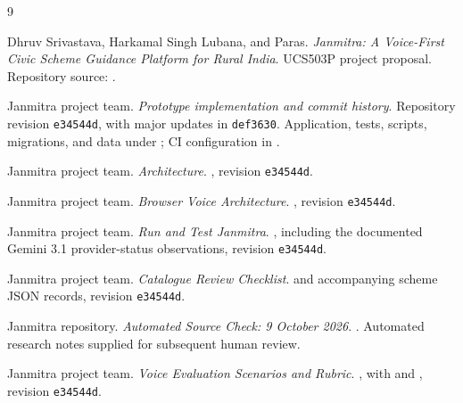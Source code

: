 \documentclass[11pt,a4paper,oneside]{report}
\newcommand{\Revision}{e34544d}
\begin{document}
\clearpage
{}
{}
\begin{thebibliography}{9}

Dhruv Srivastava, Harkamal Singh Lubana, and Paras.
\emph{Janmitra: A Voice-First Civic Scheme Guidance Platform for Rural India}.
UCS503P project proposal. Repository source: .

Janmitra project team. \emph{Prototype implementation and commit history}.
Repository revision \texttt{\Revision}, with major updates in \texttt{def3630}.
Application, tests, scripts, migrations, and data under ;
CI configuration in .

Janmitra project team. \emph{Architecture}.
, revision \texttt{\Revision}.

Janmitra project team. \emph{Browser Voice Architecture}.
, revision \texttt{\Revision}.

Janmitra project team. \emph{Run and Test Janmitra}.
, including the documented Gemini 3.1 provider-status
observations, revision \texttt{\Revision}.

Janmitra project team. \emph{Catalogue Review Checklist}.
 and accompanying scheme JSON records,
revision \texttt{\Revision}.

Janmitra repository. \emph{Automated Source Check: 9 October 2026}.
.
Automated research notes supplied for subsequent human review.

Janmitra project team. \emph{Voice Evaluation Scenarios and Rubric}.
, with
 and
, revision \texttt{\Revision}.

\end{thebibliography}
\end{document}
